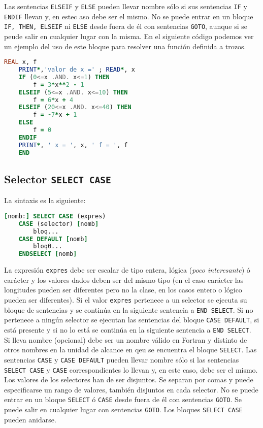 Las sentencias {\tt ELSEIF} y {\tt ELSE} pueden llevar nombre sólo si sus sentencias {\tt IF} y {\tt ENDIF} llevan y, en estec aso debe ser el mismo. No se puede entrar en un bloque {\tt IF, THEN, ELSEIF} ni {\tt ELSE} desde fuera de él con sentencias {\tt GOTO}, aunque si se peude salir en cualquier lugar con la misma. En el siguiente código podemos ver un ejemplo del uso de este bloque para resolver una función definida a trozos.

\begin{lstlisting}[language=Fortran]
	REAL x, f
	PRINT*,'valor de x =' ; READ*, x
	IF (0<=x .AND. x<=1) THEN
		f = 3*x**2 - 1
	ELSEIF (5<=x .AND. x<=10) THEN
		f = 6*x + 4
	ELSEIF (20<=x .AND. x<=40) THEN
		f = -7*x + 1
	ELSE
		f = 0
	ENDIF
	PRINT*, ' x = ', x, ' f = ', f
	END
\end{lstlisting}


\subsection{Selector {\tt SELECT CASE}}

La sintaxis es la siguiente:

\begin{lstlisting}[language=Fortran]
	[nomb:] SELECT CASE (expres) 
	CASE (selector) [nomb]
		bloq... 
	CASE DEFAULT [nomb]
		bloq0... 
	ENDSELECT [nomb]
\end{lstlisting}

La expresión {\tt expres} debe ser escalar de tipo entera, lógica ({\it poco interesante}) ó carácter y los valores dados deben ser del mismo tipo (en el caso carácter las longitudes pueden ser diferentes pero no la clase, en los casos entero o lógico pueden ser diferentes). Si el valor {\tt expres} pertenece a un selector se ejecuta su bloque de sentencias y se continúa en la siguiente sentencia a  {\tt END SELECT}. Si no pertenece a ningún selector se ejecutan las sentencias del bloque \texttt{CASE DEFAULT}, si está presente y si no lo está se continúa en la siguiente sentencia a {\tt END SELECT}. \\

Si lleva nombre (opcional) debe ser un nombre válido en Fortran y distinto de otros nombres en la unidad de alcance en qeu se encuentra el bloque {\tt SELECT}. Las sentencias \texttt{CASE} y \texttt{CASE DEFAULT} pueden llevar nombre sólo si las sentencias {\tt SELECT CASE} y {\tt CASE} correspondientes lo llevan y, en este caso, debe ser el mismo. Los valores de los selectores han de ser disjuntos. Se separan por comas y puede especificarse un rango de valores, también disjuntos en cada selector. No se puede entrar en un bloque {\tt SELECT} ó {\tt CASE} desde fuera de él con sentencias {\tt GOTO}. Se puede salir en cualquier lugar con sentencias {\tt GOTO}. Los bloques {\tt SELECT CASE} pueden anidarse. \\

